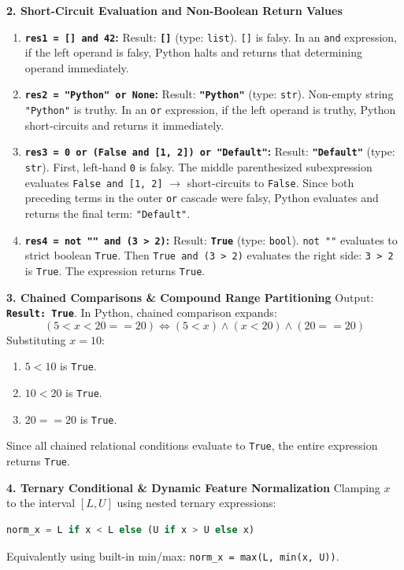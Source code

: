\textbf{2. Short-Circuit Evaluation and Non-Boolean Return Values}
\begin{enumerate}
    \item \textbf{\texttt{res1 = [] and 42}:}
    Result: \textbf{\texttt{[]}} (type: \texttt{list}).
    \texttt{[]} is falsy. In an \texttt{and} expression, if the left operand is falsy, Python halts and returns that determining operand immediately.
    \item \textbf{\texttt{res2 = "Python" or None}:}
    Result: \textbf{\texttt{"Python"}} (type: \texttt{str}).
    Non-empty string \texttt{"Python"} is truthy. In an \texttt{or} expression, if the left operand is truthy, Python short-circuits and returns it immediately.
    \item \textbf{\texttt{res3 = 0 or (False and [1, 2]) or "Default"}:}
    Result: \textbf{\texttt{"Default"}} (type: \texttt{str}).
    First, left-hand \texttt{0} is falsy. The middle parenthesized subexpression evaluates \texttt{False and [1, 2]} $\to$ short-circuits to \texttt{False}. Since both preceding terms in the outer \texttt{or} cascade were falsy, Python evaluates and returns the final term: \texttt{"Default"}.
    \item \textbf{\texttt{res4 = not "" and (3 > 2)}:}
    Result: \textbf{\texttt{True}} (type: \texttt{bool}).
    \texttt{not ""} evaluates to strict boolean \texttt{True}. Then \texttt{True and (3 > 2)} evaluates the right side: \texttt{3 > 2} is \texttt{True}. The expression returns \texttt{True}.
\end{enumerate}

\textbf{3. Chained Comparisons \& Compound Range Partitioning}
Output: \textbf{\texttt{Result: True}}.
In Python, chained comparison expands:
\begin{equation*}
(5 < x < 20 == 20) \iff (5 < x) \land (x < 20) \land (20 == 20)
\end{equation*}
Substituting $x = 10$:
\begin{enumerate}
    \item $5 < 10$ is \texttt{True}.
    \item $10 < 20$ is \texttt{True}.
    \item $20 == 20$ is \texttt{True}.
\end{enumerate}
Since all chained relational conditions evaluate to \texttt{True}, the entire expression returns \texttt{True}.

\textbf{4. Ternary Conditional \& Dynamic Feature Normalization}
Clamping $x$ to the interval $[L, U]$ using nested ternary expressions:
\begin{lstlisting}[language=Python]
norm_x = L if x < L else (U if x > U else x)
\end{lstlisting}
Equivalently using built-in min/max: \texttt{norm\_x = max(L, min(x, U))}.

